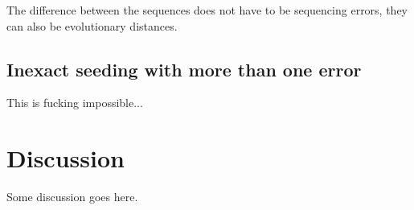 \documentclass{article}
\begin{document}
The difference between the sequences does not have to be sequencing
errors, they can also be evolutionary distances.

\subsection{Inexact seeding with more than one error}

This is fucking impossible...






\section{Discussion}

Some discussion goes here.





\end{document}
